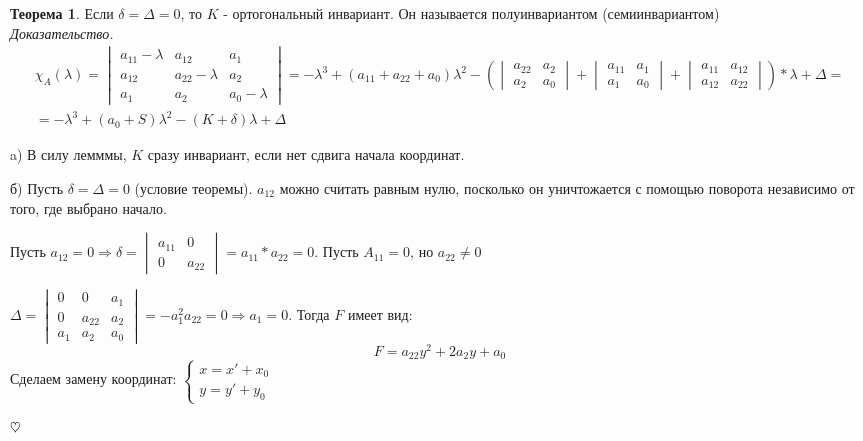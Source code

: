 \documentclass{article}
\theoremstyle{definition}
\newtheorem{theorem}{Теорема}[section]
\newenvironment{ourproof}{\textit{\\ Доказательство.\\ }}{$\hfill \heartsuit$}
\begin{document}
\begin{theorem}
Если $\delta = \Delta = 0$, то $K$ - ортогональный инвариант. Он называется полуинвариантом (семиинвариантом)
\begin{ourproof}
\begin{multline}
\chi_A (\lambda) =  \begin{vmatrix}
a_{11} - \lambda & a_{12} & a_1 \\
a_{12} & a_{22} - \lambda & a_2 \\
a_1 & a_2 & a_0 - \lambda
\end{vmatrix} = -\lambda^3 + (a_{11} + a_{22} + a_0)\lambda^2 - \left( \begin{vmatrix}
a_{22} & a_2 \\
a_2 & a_0
\end{vmatrix} + \begin{vmatrix}
a_{11} & a_1 \\
a_1 & a_0
\end{vmatrix} + \begin{vmatrix}
a_{11} & a_{12} \\
a_{12} & a_{22}
\end{vmatrix}\right) * \lambda + \Delta =\\
= -\lambda^3 + (a_0 + S) \lambda^2 - (K + \delta)\lambda + \Delta
\end{multline}

a) В силу лемммы, $K$ сразу инвариант, если нет сдвига начала координат.

б) Пусть $\delta = \Delta = 0$ (условие теоремы). $a_{12} $ можно считать равным нулю, посколько он уничтожается с помощью поворота независимо от того, где выбрано начало.

Пусть $a_{12} = 0 \Rightarrow \delta =  \begin{vmatrix}
a_{11} & 0 \\
0 & a_{22}
\end{vmatrix}  = a_{11} * a_{22} = 0$. Пусть $A_{11}= 0$, но $a_{22} \neq 0$

$\Delta =  \begin{vmatrix}
0 & 0 & a_1 \\
0 & a_{22} & a_2  \\
a_1 & a_2 & a_0
\end{vmatrix} = -a_1^2 a_{22} = 0 \Rightarrow a_1 = 0$. Тогда $F$ имеет вид: 
$$F = a_{22} y^2 + 2 a_2 y + a_0 $$
Сделаем замену координат: $\begin{cases}
x = x' + x_0 \\
y = y' + y_0
\end{cases}$


\end{ourproof}
\end{theorem}
\end{document}
